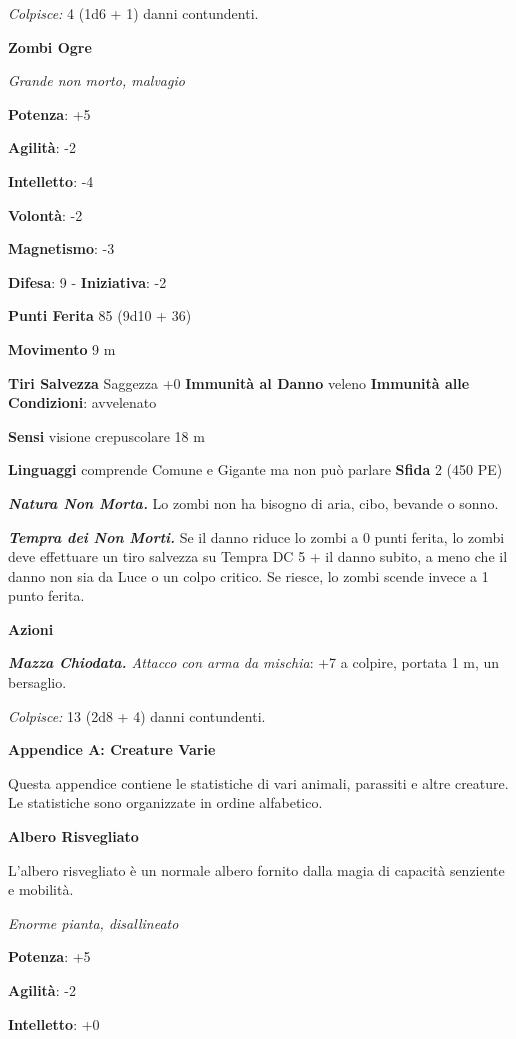 \begin{multicols}{2}
\emph{Colpisce:} 4 (1d6 + 1) danni contundenti.

\textbf{Zombi Ogre}

\emph{Grande non morto, malvagio}

\textbf{Potenza}: +5

\textbf{Agilità}: -2

\textbf{Intelletto}: -4

\textbf{Volontà}: -2

\textbf{Magnetismo}: -3

\textbf{Difesa}: 9 - \textbf{Iniziativa}: -2

\textbf{Punti Ferita} 85 (9d10 + 36)

\textbf{Movimento} 9 m

\textbf{Tiri Salvezza} Saggezza +0 \textbf{Immunità al Danno} veleno
\textbf{Immunità alle Condizioni}: avvelenato

\textbf{Sensi} visione crepuscolare 18 m

\textbf{Linguaggi} comprende Comune e Gigante ma non può parlare
\textbf{Sfida} 2 (450 PE)\smallskip

\emph{\textbf{Natura Non Morta.}} Lo zombi non ha bisogno di aria, cibo,
bevande o sonno.

\emph{\textbf{Tempra dei Non Morti.}} Se il danno riduce lo zombi a 0
punti ferita, lo zombi deve effettuare un tiro salvezza su Tempra
DC 5 + il danno subito, a meno che il danno non sia da Luce o un colpo
critico. Se riesce, lo zombi scende invece a 1 punto ferita.

\smallskip\textbf{Azioni}

\emph{\textbf{Mazza Chiodata.} Attacco con arma da mischia}: +7 a
colpire, portata 1 m, un bersaglio.

\emph{Colpisce:} 13 (2d8 + 4) danni contundenti.



\textbf{Appendice A: Creature Varie}

Questa appendice contiene le statistiche di vari animali, parassiti e
altre creature. Le statistiche sono organizzate in ordine alfabetico.

\textbf{Albero Risvegliato}

L'albero risvegliato è un normale albero fornito dalla magia di capacità
senziente e mobilità.

\emph{Enorme pianta, disallineato}

\textbf{Potenza}: +5

\textbf{Agilità}: -2

\textbf{Intelletto}: +0


\end{multicols}
